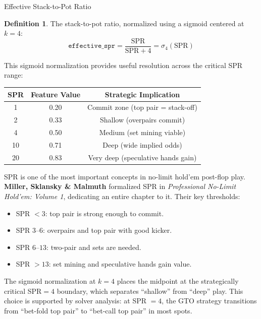 \documentclass[11pt, a4paper]{article}
\theoremstyle{definition}
\newtheorem{definition}{Definition}[section]
\newcommand{\feature}[1]{\texttt{#1}}
\begin{document}
\begin{featurebox}{Effective Stack-to-Pot Ratio}
\begin{definition}
The stack-to-pot ratio, normalized using a sigmoid centered at $k = 4$:
\begin{equation}
    \boxed{\feature{effective\_spr} = \frac{\text{SPR}}{\text{SPR} + 4} = \sigma_4(\text{SPR})}
\end{equation}

This sigmoid normalization provides useful resolution across the critical SPR range:
\begin{center}
\begin{tabular}{ccc}
\toprule
SPR & Feature Value & Strategic Implication \\
\midrule
1 & 0.20 & Commit zone (top pair = stack-off) \\
2 & 0.33 & Shallow (overpairs commit) \\
4 & 0.50 & Medium (set mining viable) \\
10 & 0.71 & Deep (wide implied odds) \\
20 & 0.83 & Very deep (speculative hands gain) \\
\bottomrule
\end{tabular}
\end{center}
\end{definition}
\end{featurebox}

\begin{refbox}
SPR is one of the most important concepts in no-limit hold'em post-flop play. \textbf{Miller, Sklansky \& Malmuth} \cite{miller2007} formalized SPR in \textit{Professional No-Limit Hold'em: Volume 1}, dedicating an entire chapter to it. Their key thresholds:
\begin{itemize}
    \item SPR $< 3$: top pair is strong enough to commit.
    \item SPR $3$--$6$: overpairs and top pair with good kicker.
    \item SPR $6$--$13$: two-pair and sets are needed.
    \item SPR $> 13$: set mining and speculative hands gain value.
\end{itemize}
The sigmoid normalization at $k = 4$ places the midpoint at the strategically critical SPR$= 4$ boundary, which separates ``shallow'' from ``deep'' play. This choice is supported by solver analysis: at SPR $= 4$, the GTO strategy transitions from ``bet-fold top pair'' to ``bet-call top pair'' in most spots.
\end{refbox}
\end{document}
